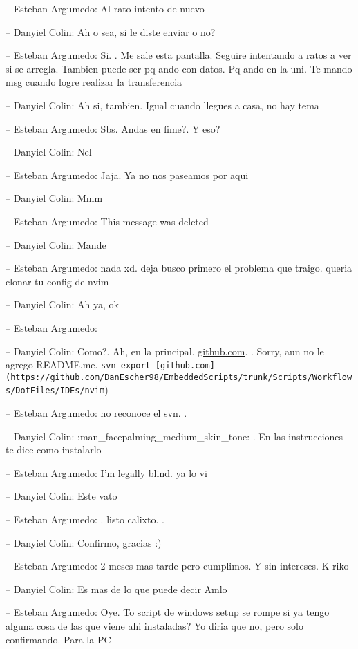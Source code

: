 -- Esteban Argumedo: Al rato intento de nuevo

-- Danyiel Colin: Ah o sea, si le diste enviar o no?

-- Esteban Argumedo: Si. . Me sale esta pantalla. Seguire intentando a
ratos a ver si se arregla. Tambien puede ser pq ando con datos. Pq ando
en la uni. Te mando msg cuando logre realizar la transferencia

-- Danyiel Colin: Ah si, tambien. Igual cuando llegues a casa, no hay
tema

-- Esteban Argumedo: Sbs. Andas en fime?. Y eso?

-- Danyiel Colin: Nel

-- Esteban Argumedo: Jaja. Ya no nos paseamos por aqui

-- Danyiel Colin: Mmm

-- Esteban Argumedo: This message was deleted

-- Danyiel Colin: Mande

-- Esteban Argumedo: nada xd. deja busco primero el problema que traigo.
queria clonar tu config de nvim

-- Danyiel Colin: Ah ya, ok

-- Esteban Argumedo:

-- Danyiel Colin: Como?. Ah, en la principal.
\href{https://github.com/DanEscher98/Escritos/tree/main/Templates/DiaryNotes}{github.com}.
. Sorry, aun no le agrego README.me.
\texttt{svn\ export\ {[}github.com{]}(https://github.com/DanEscher98/EmbeddedScripts/trunk/Scripts/Workflows/DotFiles/IDEs/nvim})

-- Esteban Argumedo: no reconoce el svn. .

-- Danyiel Colin: :man\_facepalming\_medium\_skin\_tone: . En las
instrucciones te dice como instalarlo

-- Esteban Argumedo: I'm legally blind. ya lo vi

-- Danyiel Colin: Este vato

-- Esteban Argumedo: . listo calixto. .

-- Danyiel Colin: Confirmo, gracias :)

-- Esteban Argumedo: 2 meses mas tarde pero cumplimos. Y sin intereses.
K riko

-- Danyiel Colin: Es mas de lo que puede decir Amlo

-- Esteban Argumedo: Oye. To script de windows setup se rompe si ya
tengo alguna cosa de las que viene ahi instaladas? Yo diria que no, pero
solo confirmando. Para la PC

